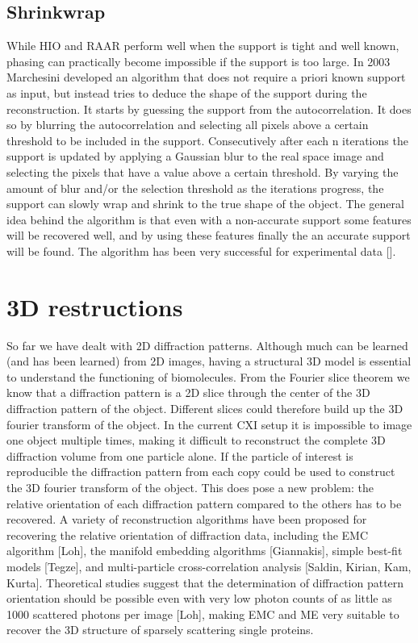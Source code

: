 \section{Shrinkwrap}
While HIO and RAAR perform well when the support is tight and well known, phasing can practically become impossible if the support is too large. In 2003 Marchesini developed an algorithm that does not require a priori known support as input, but instead tries to deduce the shape of the support during the reconstruction. It starts by guessing the support from the autocorrelation. It does so by blurring the autocorrelation and selecting all pixels above a certain threshold to be included in the support. Consecutively after each n iterations the support is updated by applying a Gaussian blur to the real space image and selecting the pixels that have a value above a certain threshold. By varying the amount of blur and/or the selection threshold as the iterations progress, the support can slowly wrap and shrink to the true shape of the object. The general idea behind the algorithm is that even with a non-accurate support some features will be recovered well, and by using these features finally the an accurate support will be found. The algorithm has been very successful for experimental data [].

\chapter{3D restructions}
So far we have dealt with 2D diffraction patterns. Although much can be learned (and has been learned) from 2D images, having a structural 3D model is essential to understand the functioning of biomolecules. From the Fourier slice theorem we know that a diffraction pattern is a 2D slice through the center of the 3D diffraction pattern of the object. Different slices could therefore build up the 3D fourier transform of the object. In the current CXI setup it is impossible to image one object multiple times, making it difficult to reconstruct the complete 3D diffraction volume from one particle alone. If the particle of interest is reproducible the diffraction pattern from each copy could be used to construct the 3D fourier transform of the object. This does pose a new problem: the relative orientation of each diffraction pattern compared to the others has to be recovered. A variety of reconstruction algorithms have been proposed for recovering the relative orientation of diffraction data, including the EMC algorithm [Loh], the manifold embedding algorithms [Giannakis], simple best-fit models [Tegze], and multi-particle cross-correlation analysis [Saldin, Kirian, Kam, Kurta]. Theoretical studies suggest that the determination of diffraction pattern orientation should be possible even with very low photon counts of as little as 1000 scattered photons per image [Loh], making EMC and ME very suitable to recover the 3D structure of sparsely scattering single proteins.


